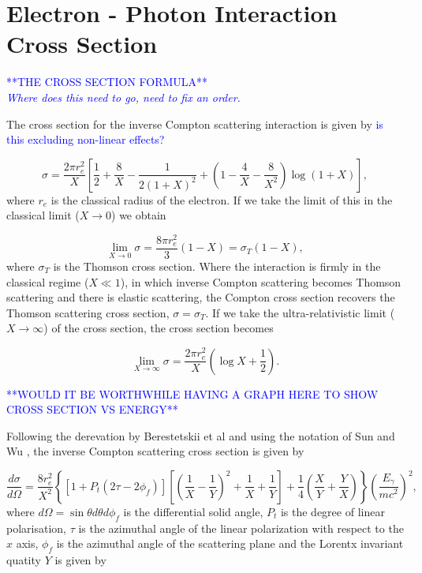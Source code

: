\documentclass[../main.tex]{subfiles}
\begin{document}
\section{Electron - Photon Interaction Cross Section}

\textcolor{blue}{**THE CROSS SECTION FORMULA** \\ \textit{Where does this need to go, need to fix an order.}}

The cross section for the inverse Compton scattering interaction \cite{landau1982course} is given by \textcolor{blue}{is this excluding non-linear effects?}

\begin{equation}
 \sigma = \frac{2\pi r_{e}^{2}}{X}\left[\frac{1}{2}+\frac{8}{X}-\frac{1}{2\left(1+X\right)^{2}}+\left(1-\frac{4}{X}-\frac{8}{X^{2}}\right)\log{\left(1+X\right)}\right],
 \label{eq:compton_cross_section}
\end{equation}
where $r_{e}$ is the classical radius of the electron. If we take the limit of this in the classical limit ($X \to 0$) we obtain

\begin{equation}
\lim_{X \to 0} \sigma = \frac{8\pi r_{e}^{2}}{3}\left(1-X\right) = \sigma_{T}\left(1-X\right),
\label{eq:compton_cross_section_classical_limit}
\end{equation}
where $\sigma_{T}$ is the Thomson cross section. Where the interaction is firmly in the classical regime ($X \ll 1$), in which inverse Compton scattering becomes Thomson scattering and there is elastic scattering, the Compton cross section recovers the Thomson scattering cross section, $\sigma = \sigma_{T}$. If we take the ultra-relativistic limit ($X \to \infty$) of the cross section, the cross section becomes

\begin{equation}
\lim_{X \to \infty} \sigma = \frac{2\pi r_{e}^{2}}{X}\left(\log{X}+\frac{1}{2}\right).
\label{eq:compton_cross_section_ultrarelativistic_limit}
\end{equation}

\textcolor{blue}{**WOULD IT BE WORTHWHILE HAVING A GRAPH HERE TO SHOW CROSS SECTION VS ENERGY**}

Following the derevation by Berestetskii et al \cite{landau1982course} and using the notation of Sun and Wu \cite{sun2011theoretical}, the inverse Compton scattering cross section is given by

\begin{equation}
\frac{d\sigma}{d\Omega} = \frac{8r_{e}^{2}}{X^{2}}\left\{\left[1+P_{t}\left(2\tau-2\phi_{f}\right)\right]\left[\left(\frac{1}{X}-\frac{1}{Y}\right)^{2}+\frac{1}{X}+\frac{1}{Y}\right]+\frac{1}{4}\left(\frac{X}{Y}+\frac{Y}{X}\right)\right\}\left(\frac{E_{\gamma}}{mc^{2}}\right)^{2},    
\end{equation}
where $d\Omega = \sin\theta d\theta d\phi_{f}$ is the differential solid angle, $P_{t}$ is the degree of linear polarisation, $\tau$ is the azimuthal angle of the linear polarization with respect to the $x$ axis, $\phi_{f}$ is the azimuthal angle of the scattering plane and the Lorentx invariant quatity $Y$ is given by
\end{document}
